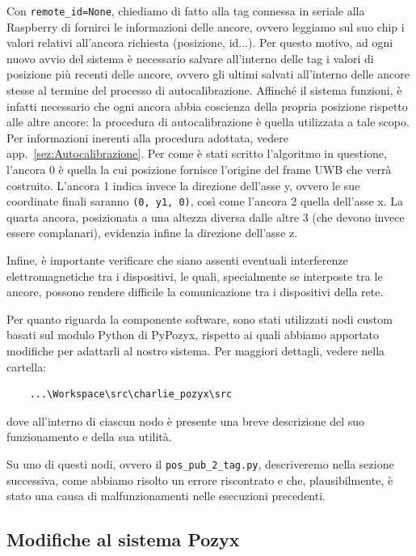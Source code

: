 Con \verb|remote_id=None|, chiediamo di fatto alla tag connessa in seriale alla Raspberry di fornirci le informazioni delle ancore, ovvero leggiamo sul suo chip i valori 
relativi all'ancora richiesta (posizione, id...).
Per questo motivo, ad ogni nuovo avvio del sistema è necessario salvare all'interno delle tag i valori di posizione più recenti delle ancore, ovvero gli ultimi 
salvati all'interno delle ancore stesse al termine del processo di autocalibrazione.
Affinché il sistema funzioni, è infatti necessario che ogni ancora abbia coscienza della propria posizione rispetto alle altre ancore: la procedura di 
autocalibrazione è quella utilizzata a tale scopo.
Per informazioni inerenti alla procedura adottata, vedere app.~\ref{sez:Autocalibrazione}. 
Per come è stati scritto l'algoritmo in questione, l'ancora 0 è quella 
la cui posizione fornisce l'origine del frame UWB che verrà costruito. 
L'ancora 1 indica invece la direzione dell'asse y, ovvero le sue coordinate finali saranno \verb|(0, y1, 0)|, così come l'ancora 2 quella dell'asse x. 
La quarta ancora, posizionata a una altezza diversa dalle altre 3 (che devono invece essere complanari), evidenzia infine la direzione dell'asse z.

Infine, è importante verificare che siano assenti eventuali interferenze elettromagnetiche tra i dispositivi, le quali, specialmente se interposte tra le ancore, possono rendere difficile la comunicazione tra i dispositivi della rete.

Per quanto riguarda la componente software, sono stati utilizzati nodi custom basati sul modulo Python di PyPozyx, rispetto ai quali abbiamo apportato modifiche 
per adattarli al nostro sistema. Per maggiori dettagli, vedere nella cartella:
\begin{verbatim}
	...\Workspace\src\charlie_pozyx\src
\end{verbatim}
dove all'interno di ciascun nodo è presente una breve descrizione del suo funzionamento e della sua utilità.

\vspace{0.5 cm}
Su uno di questi nodi, ovvero il \verb|pos_pub_2_tag.py|, descriveremo nella sezione successiva, come abbiamo risolto un errore riscontrato e che, plausibilmente, è stato una causa
di malfunzionamenti nelle esecuzioni precedenti. 

\subsection{Modifiche al sistema Pozyx}
\label{sez:Modifiche Pozyx}

